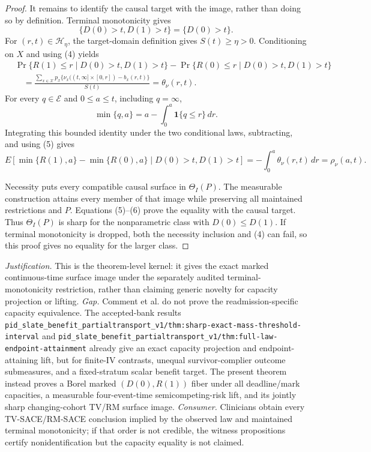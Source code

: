 \documentclass{article}
\begin{document}
\begin{proof}
It remains to identify the causal target with the image, rather than doing so by definition.  Terminal monotonicity gives
\[
\{D(0)>t,D(1)>t\}=\{D(0)>t\}.                                      \tag{4}
\]
For \((r,t)\in\mathcal H_\eta\), the target-domain definition gives \(S(t)\geq\eta>0\).  Conditioning on \(X\) and using (4) yields
\[
\begin{aligned}
&\Pr\{R(1)\leq r\mid D(0)>t,D(1)>t\}
-\Pr\{R(0)\leq r\mid D(0)>t,D(1)>t\}\\
&\quad=\frac{\sum_{x\in\mathcal X}p_x
\{\nu_x((t,\infty]\times[0,r])-b_x(r,t)\}}{S(t)}
=\theta_\nu(r,t).                                                    \tag{5}
\end{aligned}
\]
For every \(q\in\mathcal E\) and \(0\leq a\leq t\), including \(q=\infty\),
\[
\min\{q,a\}=a-\int_0^a\mathbf 1\{q\leq r\}\,dr.
\]
Integrating this bounded identity under the two conditional laws, subtracting, and using (5) gives
\[
E[\min\{R(1),a\}-\min\{R(0),a\}\mid D(0)>t,D(1)>t]
=-\int_0^a\theta_\nu(r,t)\,dr
=\rho_\nu(a,t).                                                       \tag{6}
\]

Necessity puts every compatible causal surface in \(\Theta_I(P)\).  The measurable construction attains every member of that image while preserving all maintained restrictions and \(P\).  Equations (5)--(6) prove the equality with the causal target.  Thus \(\Theta_I(P)\) is sharp for the nonparametric class with \(D(0)\leq D(1)\).  If terminal monotonicity is dropped, both the necessity inclusion and (4) can fail, so this proof gives no equality for the larger class.
\end{proof}
\par\smallskip\noindent \textit{Justification.} This is the theorem-level kernel: it gives the exact marked continuous-time surface image under the separately audited terminal-monotonicity restriction, rather than claiming generic novelty for capacity projection or lifting. \textit{Gap.} Comment et al. do not prove the readmission-specific capacity equivalence.  The accepted-bank results \texttt{pid\_slate\_benefit\_partialtransport\_v1/thm:sharp-exact-mass-threshold-interval} and \texttt{pid\_slate\_benefit\_partialtransport\_v1/thm:full-law-endpoint-attainment} already give an exact capacity projection and endpoint-attaining lift, but for finite-IV contrasts, unequal survivor-complier outcome submeasures, and a fixed-stratum scalar benefit target.  The present theorem instead proves a Borel marked \( (D(0),R(1)) \) fiber under all deadline/mark capacities, a measurable four-event-time semicompeting-risk lift, and its jointly sharp changing-cohort TV/RM surface image. \textit{Consumer.} Clinicians obtain every TV-SACE/RM-SACE conclusion implied by the observed law and maintained terminal monotonicity; if that order is not credible, the witness propositions certify nonidentification but the capacity equality is not claimed.
\end{document}
